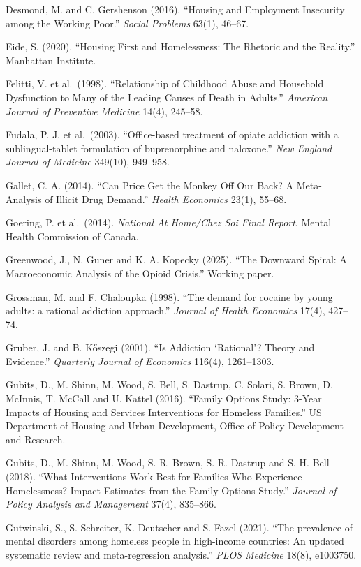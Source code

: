 \documentclass[10pt]{article}
\begin{document}
{\begin{list}{}{\setlength{\leftmargin}{1.5em}\setlength{\itemindent}{-1.5em}\setlength{\itemsep}{0.35em}\setlength{\parsep}{0em}}
\item Desmond, M. and C. Gershenson (2016). ``Housing and Employment Insecurity among the Working Poor.'' \emph{Social Problems} 63(1), 46--67.
\item Eide, S. (2020). ``Housing First and Homelessness: The Rhetoric and the Reality.'' Manhattan Institute.
\item Felitti, V. et al.\ (1998). ``Relationship of Childhood Abuse and Household Dysfunction to Many of the Leading Causes of Death in Adults.'' \emph{American Journal of Preventive Medicine} 14(4), 245--58.
\item Fudala, P. J. et al.\ (2003). ``Office-based treatment of opiate addiction with a sublingual-tablet formulation of buprenorphine and naloxone.'' \emph{New England Journal of Medicine} 349(10), 949--958.
\item Gallet, C. A. (2014). ``Can Price Get the Monkey Off Our Back? A Meta-Analysis of Illicit Drug Demand.'' \emph{Health Economics} 23(1), 55--68.
\item Goering, P. et al.\ (2014). \emph{National At Home/Chez Soi Final Report}. Mental Health Commission of Canada.
\item Greenwood, J., N. Guner and K. A. Kopecky (2025). ``The Downward Spiral: A Macroeconomic Analysis of the Opioid Crisis.'' Working paper.
\item Grossman, M. and F. Chaloupka (1998). ``The demand for cocaine by young adults: a rational addiction approach.'' \emph{Journal of Health Economics} 17(4), 427--74.
\item Gruber, J. and B. K\H{o}szegi (2001). ``Is Addiction `Rational'? Theory and Evidence.'' \emph{Quarterly Journal of Economics} 116(4), 1261--1303.
\item Gubits, D., M. Shinn, M. Wood, S. Bell, S. Dastrup, C. Solari, S. Brown, D. McInnis, T. McCall and U. Kattel (2016). ``Family Options Study: 3-Year Impacts of Housing and Services Interventions for Homeless Families.'' US Department of Housing and Urban Development, Office of Policy Development and Research.
\item Gubits, D., M. Shinn, M. Wood, S. R. Brown, S. R. Dastrup and S. H. Bell (2018). ``What Interventions Work Best for Families Who Experience Homelessness? Impact Estimates from the Family Options Study.'' \emph{Journal of Policy Analysis and Management} 37(4), 835--866.
\item Gutwinski, S., S. Schreiter, K. Deutscher and S. Fazel (2021). ``The prevalence of mental disorders among homeless people in high-income countries: An updated systematic review and meta-regression analysis.'' \emph{PLOS Medicine} 18(8), e1003750.

\end{list}}
\end{document}
